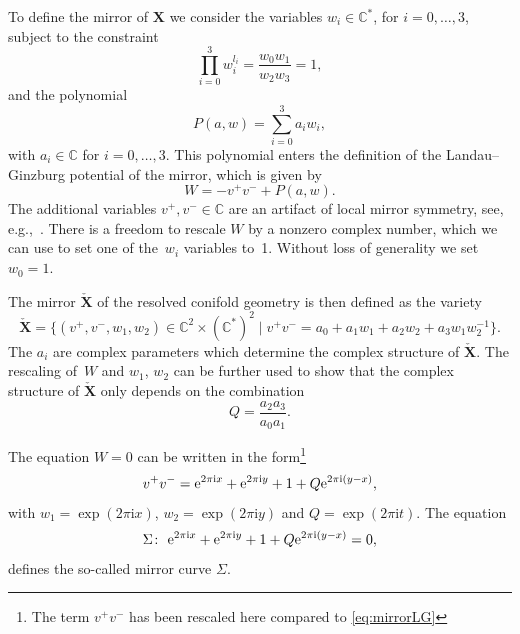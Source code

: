 \documentclass[pdftex]{sigma}
\numberwithin{equation}{section}
\begin{document}
To define the mirror of $\mathbf{X}$ we consider the variables $w_i \in \mathbb{C}^*$, for $i=0,\dots,3$, subject to the constraint
\begin{equation*}
 \prod_{i=0}^{3} w_i^{l_i}= \frac{w_0 w_1}{w_2 w_3}=1,
\end{equation*}
and the polynomial
\begin{equation*}
 P(a,w)=\sum_{i=0}^3 a_i w_i,
\end{equation*}
with $a_i \in \mathbb{C}$ for $i=0,\ldots,3$. This polynomial enters the definition of the Landau--Ginzburg potential of the mirror, which is given by
\begin{equation}\label{eq:mirrorLG}
 W= -v^+ v^- + P(a,w).
\end{equation}
The additional variables $v^+,v^- \in \mathbb{C}$ are an artifact of local mirror symmetry, see, e.g.,~\cite{Hori:2000kt}. There is a freedom to rescale $W$ by a nonzero complex number, which we can use to set one of the~$w_i$ variables to~1. Without loss of generality we set $w_0=1$.

The mirror $\check{\mathbf{X}}$ of the resolved conifold geometry is then defined as the variety
\begin{equation*}
 \check{\mathbf{X}}= \big\{ (v^+,v^-,w_1,w_2) \in \mathbb{C}^2\times (\mathbb{C}^*)^2 \mid v^+ v^- = a_0 + a_1 w_1 + a_2 w_2 + a_3 w_1 w_2^{-1} \big\}.
\end{equation*}
The $a_i$ are complex parameters which determine the complex structure of $\check{\mathbf{X}}$. The rescaling of~$W$ and $w_1$, $w_2$ can be further used to show that the complex structure of $\check{\mathbf{X}}$ only depends on the combination
\begin{equation}\label{Qa}
Q=\frac{a_2 a_3}{a_0 a_1}.
\end{equation}

The equation $W=0$ can be written in the form\footnote{The term $v^+ v^-$ has been rescaled here compared to \eqref{eq:mirrorLG}}
\begin{equation*}
 v^+ v^- = {\rm e}^{2 \pi \mathrm{i} x} + {\rm e}^{2 \pi \mathrm{i} y} + 1 + Q {\rm e}^{2 \pi \mathrm{i} (y-x)},
\end{equation*}
with $w_1=\exp(2 \pi \mathrm{i} x)$, $w_2=\exp(2 \pi \mathrm{i} y)$ and $Q = \exp( 2 \pi \mathrm{i} t)$.
The equation
\begin{equation}\label{eqn:mirrorcurve1}
\Sigma\colon \ {\rm e}^{2 \pi \mathrm{i} x} + {\rm e}^{2 \pi \mathrm{i} y} + 1 + Q {\rm e}^{2 \pi \mathrm{i} (y-x)} = 0,
\end{equation}
defines the so-called mirror curve $\Sigma$.
\end{document}
